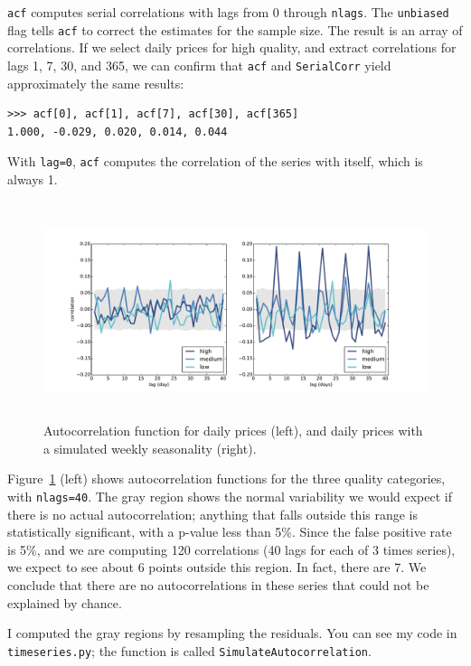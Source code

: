 \documentclass[12pt]{book}
\begin{document}
{\tt acf} computes serial correlations with
lags from 0 through {\tt nlags}.  The {\tt unbiased} flag tells
{\tt acf} to correct the estimates for the sample size.  The result
is an array of correlations.  If we select daily prices for high
quality, and extract correlations for lags 1, 7, 30, and 365, we can
confirm that {\tt acf} and {\tt SerialCorr} yield approximately
the same results:

\begin{verbatim}
>>> acf[0], acf[1], acf[7], acf[30], acf[365]
1.000, -0.029, 0.020, 0.014, 0.044
\end{verbatim}

With {\tt lag=0}, {\tt acf} computes the correlation of the series
with itself, which is always 1.

\begin{figure}
\centerline{\includegraphics[height=2.5in]{figs/timeseries9.pdf}}
\caption{Autocorrelation function for daily prices (left), and
daily prices with a simulated weekly seasonality (right).}
\label{timeseries9}
\end{figure}

Figure~\ref{timeseries9} (left) shows autocorrelation functions for
the three quality categories, with {\tt nlags=40}.  The gray region
shows the normal variability we would expect if there is no actual
autocorrelation; anything that falls outside this range is
statistically significant, with a p-value less than 5\%.  Since
the false positive rate is 5\%, and
we are computing 120 correlations (40 lags for each of 3 times series),
we expect to see about 6 points outside this region.  In fact, there
are 7.  We conclude that there are no autocorrelations
in these series that could not be explained by chance.
   

I computed the gray regions by resampling the residuals.  You
can see my code in {\tt timeseries.py}; the function is called
{\tt SimulateAutocorrelation}.
\end{document}
